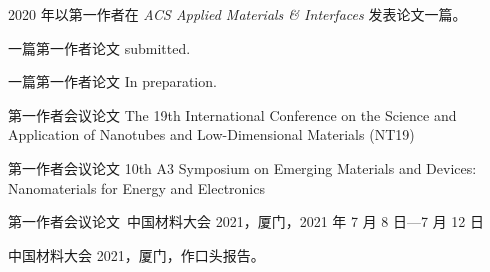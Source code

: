 \begin{achievements*}

  \begin{theachievements}[已发表论文]
    \item 2020 年以第一作者在 \emph{ACS Applied Materials \& Interfaces} 发表论文一篇。
  \end{theachievements}

  \begin{theachievements}[待发表期刊论文]
    \item 一篇第一作者论文 submitted.
    \item 一篇第一作者论文 In preparation.
  \end{theachievements}

  \begin{theachievements}[会议论文]
    \item 第一作者会议论文 The 19th International Conference on the Science
      and Application of Nanotubes and Low-Dimensional Materials (NT19)
    \item 第一作者会议论文 10th A3 Symposium on Emerging Materials and
      Devices: Nanomaterials for Energy and Electronics
    \item 第一作者会议论文\ 中国材料大会 2021，厦门，2021 年 7 月 8 日—7 月 12 日
  \end{theachievements}

  \begin{theachievements}[口头报告]
    \item 中国材料大会 2021，厦门，作口头报告。
  \end{theachievements}

\end{achievements*}
